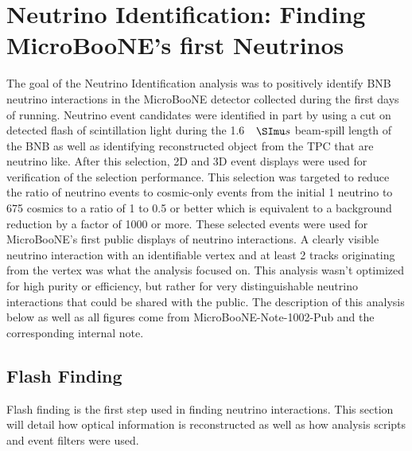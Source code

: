 \chapter{Neutrino Identification: Finding MicroBooNE's first Neutrinos} \label{ch:neutrinoID}
The goal of the Neutrino Identification analysis was to positively identify BNB neutrino interactions in the MicroBooNE detector collected during the first days of running. Neutrino event candidates were identified in part by using a cut on detected flash of scintillation light during the 1.6 $\micro s$ beam-spill length of the BNB as well as identifying reconstructed object from the TPC that are neutrino like. After this selection, 2D and 3D event displays were used for verification of the selection performance. This selection was targeted to reduce the ratio of neutrino events to cosmic-only events from the initial 1 neutrino to 675 cosmics to a ratio of 1 to 0.5 or better which is equivalent to a background reduction by a factor of 1000 or more. These selected events were used for MicroBooNE's first public displays of neutrino interactions. A clearly visible neutrino interaction with an identifiable vertex and at least 2 tracks originating from the vertex was what the analysis focused on. This analysis wasn't optimized for high purity or efficiency, but rather for very distinguishable neutrino interactions that could be shared with the public. The description of this analysis below as well as all figures come from MicroBooNE-Note-1002-Pub \cite{neutrinoid} and the corresponding internal note.
\section{Flash Finding}\label{sec:flashfinding}
Flash finding is the first step used in finding neutrino interactions. This section will detail how optical information is reconstructed as well as how analysis scripts and event filters were used.
